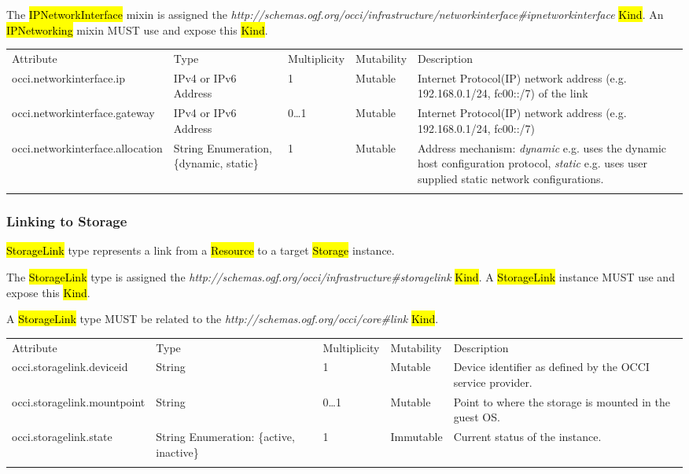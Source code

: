 \documentclass[10pt,a4paper]{article}
\begin{document}
The \hl{IPNetworkInterface} mixin is assigned the 
\textit{http://schemas.ogf.org/occi/infrastructure/networkinterface\#ipnetworkinterface} 
\hl{Kind}. An \hl{IPNetworking} mixin MUST use and expose this \hl{Kind}.

\begin{tabular}{lp{2.5cm}p{1cm}lp{6cm}}
\toprule
Attribute&Type&Multi\-plicity&Mutability&Description\\
\colrule
occi.networkinterface.ip & IPv4 or IPv6 Address & 1 & Mutable & Internet Protocol(IP) network address (e.g. 192.168.0.1/24, fc00::/7) of the link\\
occi.networkinterface.gateway & IPv4 or IPv6 Address & 0\ldots1 & Mutable & Internet Protocol(IP) network address (e.g. 192.168.0.1/24, fc00::/7)\\
occi.networkinterface.allocation & String Enumeration, \{dynamic, static\} & 1 & Mutable & Address mechanism: \textit{dynamic} e.g. uses the dynamic host configuration protocol, \textit{static} e.g. uses user supplied static network configurations.\\
\botrule
\end{tabular}

\subsubsection{Linking to Storage}
\hl{StorageLink} type represents a link from a \hl{Resource} to a target \hl{Storage} instance.

The \hl{StorageLink} type is assigned the  
\textit{http://schemas.ogf.org/occi/infrastructure\#storagelink} \hl{Kind}. A \hl{StorageLink}
instance MUST use and expose this \hl{Kind}. 

A \hl{StorageLink} type MUST be related to the \textit{http://schemas.ogf.org/occi/core\#link} \hl{Kind}.

{
	\begin{tabular}{lp{2.5cm}p{1cm}lp{6cm}}
	\toprule
	Attribute&Type&Multi\-plicity&Mutability&Description\\
	\colrule
	occi.storagelink.deviceid & String & 1 & Mutable 
	& Device identifier as defined by the OCCI service provider.\\
	occi.storagelink.mountpoint & String & 0\ldots1 & Mutable 
	& Point to where the storage is mounted in the guest OS.\\
	occi.storagelink.state & String Enumeration: \{active, inactive\}& 1 
	& Immutable & Current status of the instance.\\
	\botrule
	\end{tabular}
}
\end{document}
